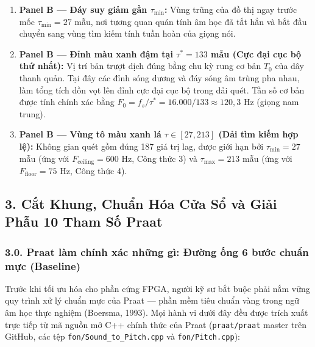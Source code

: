 \documentclass[11pt,a4paper]{article}
\begin{document}
\begin{enumerate}
    \item \textbf{Panel B --- Đáy suy giảm gần $\tau_{\min}$:} Vùng trũng của đồ thị ngay trước mốc $\tau_{\min} = 27$ mẫu, nơi tương quan quán tính âm học đã tắt hẳn và bắt đầu chuyển sang vùng tìm kiếm tính tuần hoàn của giọng nói.
    \item \textbf{Panel B --- Đỉnh màu xanh đậm tại $\tau^* = 133$ mẫu (Cực đại cục bộ thứ nhất):} Vị trí bản trượt dịch đúng bằng chu kỳ rung cơ bản $T_0$ của dây thanh quản. Tại đây các đỉnh sóng dương và đáy sóng âm trùng pha nhau, làm tổng tích dồn vọt lên đỉnh cực đại cục bộ trong dải quét. Tần số cơ bản được tính chính xác bằng $F_0 = f_s / \tau^* = 16.000 / 133 \approx 120{,}3\text{ Hz}$ (giọng nam trung).
    \item \textbf{Panel B --- Vùng tô màu xanh lá $\tau \in [27, 213]$ (Dải tìm kiếm hợp lệ):} Không gian quét gồm đúng 187 giá trị lag, được giới hạn bởi $\tau_{\min} = 27$ mẫu (ứng với $F_{\text{ceiling}} = 600\text{ Hz}$, Công thức 3) và $\tau_{\max} = 213$ mẫu (ứng với $F_{\text{floor}} = 75\text{ Hz}$, Công thức 4).
\end{enumerate}

\subsection*{3. Cắt Khung, Chuẩn Hóa Cửa Sổ và Giải Phẫu 10 Tham Số Praat}

\subsubsection*{3.0. Praat làm chính xác những gì: Đường ống 6 bước chuẩn mực (Baseline)}

Trước khi tối ưu hóa cho phần cứng FPGA, người kỹ sư bắt buộc phải nắm vững quy trình xử lý chuẩn mực của Praat --- phần mềm tiêu chuẩn vàng trong ngữ âm học thực nghiệm (Boersma, 1993). Mọi hành vi dưới đây đều được trích xuất trực tiếp từ mã nguồn mở C++ chính thức của Praat (\texttt{praat/praat} master trên GitHub, các tệp \texttt{fon/Sound\_to\_Pitch.cpp} và \texttt{fon/Pitch.cpp}):
\end{document}
